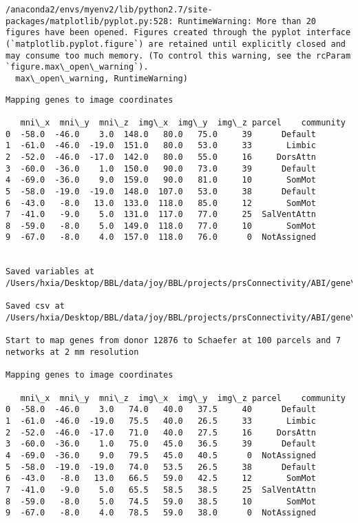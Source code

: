 \documentclass[11pt]{article}
\begin{document}
    \begin{Verbatim}[commandchars=\\\{\}]
/anaconda2/envs/myenv2/lib/python2.7/site-packages/matplotlib/pyplot.py:528: RuntimeWarning: More than 20 figures have been opened. Figures created through the pyplot interface (`matplotlib.pyplot.figure`) are retained until explicitly closed and may consume too much memory. (To control this warning, see the rcParam `figure.max\_open\_warning`).
  max\_open\_warning, RuntimeWarning)

    \end{Verbatim}

    \begin{Verbatim}[commandchars=\\\{\}]
Mapping genes to image coordinates

   mni\_x  mni\_y  mni\_z  img\_x  img\_y  img\_z parcel    community
0  -58.0  -46.0    3.0  148.0   80.0   75.0     39      Default
1  -61.0  -46.0  -19.0  151.0   80.0   53.0     33       Limbic
2  -52.0  -46.0  -17.0  142.0   80.0   55.0     16     DorsAttn
3  -60.0  -36.0    1.0  150.0   90.0   73.0     39      Default
4  -69.0  -36.0    9.0  159.0   90.0   81.0     10       SomMot
5  -58.0  -19.0  -19.0  148.0  107.0   53.0     38      Default
6  -43.0   -8.0   13.0  133.0  118.0   85.0     12       SomMot
7  -41.0   -9.0    5.0  131.0  117.0   77.0     25  SalVentAttn
8  -59.0   -8.0    5.0  149.0  118.0   77.0     10       SomMot
9  -67.0   -8.0    4.0  157.0  118.0   76.0      0  NotAssigned


Saved variables at /Users/hxia/Desktop/BBL/data/joy/BBL/projects/prsConnectivity/ABI/gene\_mapping/12876donor\_100Parcels\_7Network\_1mm.pkl

Saved csv at /Users/hxia/Desktop/BBL/data/joy/BBL/projects/prsConnectivity/ABI/gene\_mapping/12876donor\_100Parcels\_7Network\_1mm.csv

Start to map genes from donor 12876 to Schaefer at 100 parcels and 7 networks at 2 mm resolution

Mapping genes to image coordinates

   mni\_x  mni\_y  mni\_z  img\_x  img\_y  img\_z parcel    community
0  -58.0  -46.0    3.0   74.0   40.0   37.5     40      Default
1  -61.0  -46.0  -19.0   75.5   40.0   26.5     33       Limbic
2  -52.0  -46.0  -17.0   71.0   40.0   27.5     16     DorsAttn
3  -60.0  -36.0    1.0   75.0   45.0   36.5     39      Default
4  -69.0  -36.0    9.0   79.5   45.0   40.5      0  NotAssigned
5  -58.0  -19.0  -19.0   74.0   53.5   26.5     38      Default
6  -43.0   -8.0   13.0   66.5   59.0   42.5     12       SomMot
7  -41.0   -9.0    5.0   65.5   58.5   38.5     25  SalVentAttn
8  -59.0   -8.0    5.0   74.5   59.0   38.5     10       SomMot
9  -67.0   -8.0    4.0   78.5   59.0   38.0      0  NotAssigned



\end{Verbatim}
\end{document}
